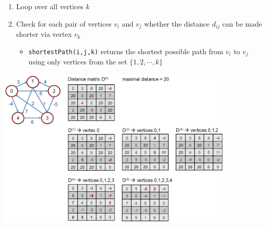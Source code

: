 \begin{enumerate}
    \item Loop over all vertices $k$
    \item Check for each pair of vertices $v_i$ and $v_j$ whether the distance $d_{ij}$ can be made shorter via vertex $v_k$
    \begin{itemize}
        \item \lstinline|shortestPath(i,j,k)| returns the shortest possible path from $v_i$ to $v_j$ using only vertices from the set $\{1,2,\cdots,k\}$
    \end{itemize}
\end{enumerate}

\begin{center}\includegraphics[width=0.85\textwidth]{img/graphs/FloydWarshallGraph.png}\end{center}

%